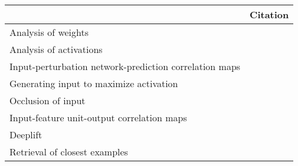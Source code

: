 \begin{tabular}{ll}
\toprule
{} &                                                                                                                                                                                          Citation \\
\midrule
Analysis of weights                                    &  \cite{Perez-Benitez2018, Yoon2018, Langkvist2018, Deiss2018, Lawhern2018, Xu2016, Tsinalis2016a, Nurse2016, Tabar2016a, Zheng2015, Stober2015, Manor2015, Yang2015a, Langkvist2012, Cecotti2011} \\
Analysis of activations                                &                                                                                           \cite{Yuan2018a, Waytowich2018, Lawhern2018, kwak2017, Yin2017a, Supratak2017, Shamwell2016, Manor2015} \\
Input-perturbation network-prediction correlation maps &                                                                                                              \cite{Schirrmeister2017a, Volker2018, Hartmann2018b, Behncke2017, Schirrmeister2017} \\
Generating input to maximize activation                &                                                                                                                                      \cite{VanPutten2018b, Ruffini2018a, Sors2018, Bashivan2016a} \\
Occlusion of input                                     &                                                                                                                                                        \cite{Lee2018, Chambon2018, Thodoroff2016} \\
Input-feature unit-output correlation maps             &                                                                                                                                                                          \cite{Schirrmeister2017} \\
Deeplift                                               &                                                                                                                                                                                \cite{Lawhern2018} \\
Retrieval of closest examples                          &                                                                                                                                                                                  \cite{Deiss2018} \\

\end{tabular}
